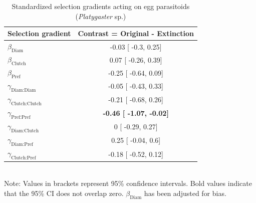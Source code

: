 \documentclass[11pt,]{article}
\begin{document}
\bigskip

\begin{table}[h]
\caption{Standardized selection gradients acting on egg parasitoids (\textit{Platygaster} sp.)}
\label{Table:ExtendedGradients}
\centering
\begin{tabular}{lc}
\\ 
\hline
\textbf{Selection gradient} & \textbf{Contrast = Original - Extinction}  \\ 
\hline
$\beta_{\text{Diam}}$ & 

-0.03 [
-0.3,
0.25] \\

$\beta_{\text{Clutch}}$ & 

0.07 [
-0.26,
0.39] \\

$\beta_{\text{Pref}}$ &

-0.25 [
-0.64,
0.09] \\

$\gamma_{\text{Diam:Diam}}$ &

-0.05 [
-0.43,
0.33] \\

$\gamma_{\text{Clutch:Clutch}}$ & 

-0.21 [
-0.68,
0.26] \\

$\gamma_{\text{Pref:Pref}}$ & 

\textbf{
-0.46 [
-1.07,
-0.02] }\\

$\gamma_{\text{Diam:Clutch}}$ & 

0 [
-0.29,
0.27] \\

$\gamma_{\text{Diam:Pref}}$ & 

0.25 [
-0.04,
0.6] \\

$\gamma_{\text{Clutch:Pref}}$ & 

-0.18 [
-0.52,
0.12] \\ 
\hline
\end{tabular}
\bigskip{}
\\
{\footnotesize Note: Values in brackets represent 95\% confidence intervals. Bold values indicate that the 95\% CI does not overlap zero. $\beta_{\text{Diam}}$ has been adjusted for bias.}
\end{table}
\end{document}
